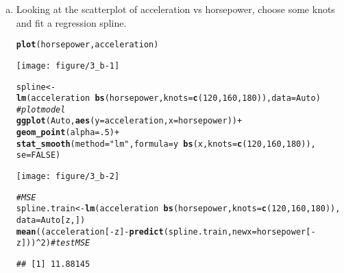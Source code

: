 \documentclass[12pt,fleqn]{article}\usepackage[]{graphicx}\usepackage[]{color}
\makeatletter
\def\maxwidth{ %
  \ifdim\Gin@nat@width>\linewidth
    \linewidth
  \else
    \Gin@nat@width
  \fi
}
\newcommand{\hlnum}[1]{\textcolor[rgb]{0.686,0.059,0.569}{#1}}%
\newcommand{\hlstr}[1]{\textcolor[rgb]{0.192,0.494,0.8}{#1}}%
\newcommand{\hlcom}[1]{\textcolor[rgb]{0.678,0.584,0.686}{\textit{#1}}}%
\newcommand{\hlopt}[1]{\textcolor[rgb]{0,0,0}{#1}}%
\newcommand{\hlstd}[1]{\textcolor[rgb]{0.345,0.345,0.345}{#1}}%
\newcommand{\hlkwb}[1]{\textcolor[rgb]{0.69,0.353,0.396}{#1}}%
\newcommand{\hlkwc}[1]{\textcolor[rgb]{0.333,0.667,0.333}{#1}}%
\newcommand{\hlkwd}[1]{\textcolor[rgb]{0.737,0.353,0.396}{\textbf{#1}}}%
\newenvironment{kframe}{%
 \def\at@end@of@kframe{}%
 \ifinner\ifhmode%
  \def\at@end@of@kframe{\end{minipage}}%
  \begin{minipage}{\columnwidth}%
 \fi\fi%
 \def\FrameCommand##1{\hskip\@totalleftmargin \hskip-\fboxsep
 \colorbox{shadecolor}{##1}\hskip-\fboxsep
     \hskip-\linewidth \hskip-\@totalleftmargin \hskip\columnwidth}%
 \MakeFramed {\advance\hsize-\width
   \@totalleftmargin\z@ \linewidth\hsize
   \@setminipage}}%
 {\par\unskip\endMakeFramed%
 \at@end@of@kframe}
\newenvironment{knitrout}{}{} %
\theoremstyle{definition}
\makeatother
\begin{document}
\begin{enumerate}[1.]
\begin{enumerate}[(a)]
          \item Looking at the scatterplot of acceleration vs horsepower, choose some knots and fit a regression spline.
\begin{knitrout}
\color{fgcolor}\begin{kframe}
\begin{alltt}
\hlkwd{plot}\hlstd{(horsepower, acceleration)}
\end{alltt}
\end{kframe}
\texttt{[image: figure/3\_b-1]} 
\begin{kframe}\begin{alltt}
\hlstd{spline} \hlkwb{<-} \hlkwd{lm}\hlstd{( acceleration} \hlopt{~} \hlkwd{bs}\hlstd{(horsepower,} \hlkwc{knots} \hlstd{=} \hlkwd{c}\hlstd{(}\hlnum{120}\hlstd{,}\hlnum{160}\hlstd{,}\hlnum{180}\hlstd{)),} \hlkwc{data} \hlstd{= Auto)}
\hlcom{# plot model}
\hlkwd{ggplot}\hlstd{(Auto,} \hlkwd{aes}\hlstd{(}\hlkwc{y}\hlstd{=acceleration,} \hlkwc{x}\hlstd{=horsepower))} \hlopt{+}
  \hlkwd{geom_point}\hlstd{(}\hlkwc{alpha} \hlstd{=} \hlnum{.5}\hlstd{)} \hlopt{+}
  \hlkwd{stat_smooth}\hlstd{(}\hlkwc{method} \hlstd{=} \hlstr{"lm"}\hlstd{,} \hlkwc{formula} \hlstd{= y}\hlopt{~} \hlkwd{bs}\hlstd{(x,} \hlkwc{knots} \hlstd{=} \hlkwd{c}\hlstd{(}\hlnum{120}\hlstd{,}\hlnum{160}\hlstd{,}\hlnum{180}\hlstd{)),}
              \hlkwc{se} \hlstd{=} \hlnum{FALSE}\hlstd{)}
\end{alltt}
\end{kframe}
\texttt{[image: figure/3\_b-2]} 
\begin{kframe}\begin{alltt}
\hlcom{# MSE}
\hlstd{spline.train} \hlkwb{<-} \hlkwd{lm}\hlstd{( acceleration} \hlopt{~} \hlkwd{bs}\hlstd{(horsepower,} \hlkwc{knots} \hlstd{=} \hlkwd{c}\hlstd{(}\hlnum{120}\hlstd{,}\hlnum{160}\hlstd{,}\hlnum{180}\hlstd{)),}
                    \hlkwc{data} \hlstd{= Auto[z,])}
\hlkwd{mean}\hlstd{((acceleration[}\hlopt{-}\hlstd{z]} \hlopt{-} \hlkwd{predict}\hlstd{(spline.train,} \hlkwc{newx}\hlstd{=horsepower[}\hlopt{-}\hlstd{z]))}\hlopt{^}\hlnum{2}\hlstd{)} \hlcom{# test MSE}
\end{alltt}
\begin{verbatim}
## [1] 11.88145
\end{verbatim}
\end{kframe}
\end{knitrout}


\end{enumerate}
\end{enumerate}
\end{document}

